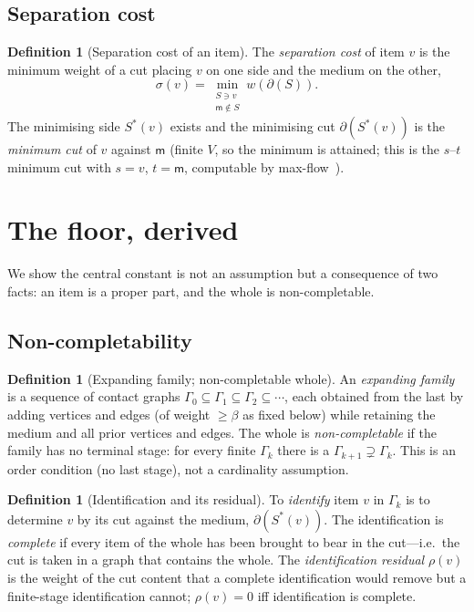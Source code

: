 \documentclass[11pt,a4paper]{article}
\theoremstyle{thmstyle}
\theoremstyle{definition}
\newtheorem{definition}[theorem]{Definition}
\theoremstyle{remark}
\newcommand{\Gph}{\Gamma}
\newcommand{\V}{V}
\newcommand{\wt}{w}
\newcommand{\med}{\mathsf{m}}            %
\newcommand{\flo}{\beta}                 %
\newcommand{\cut}{\partial}              %
\newcommand{\res}{\rho}                  %
\newcommand{\str}{\sigma}                %
\begin{document}
\subsection{Separation cost}

\begin{definition}[Separation cost of an item]
\label{def:sepcost}
The \emph{separation cost} of item $v$ is the minimum weight of a cut
placing $v$ on one side and the medium on the other,
\[
\str(v)=\min_{\substack{S\ni v\\ \med\notin S}}\wt(\cut(S)).
\]
The minimising side $S^{\ast}(v)$ exists and the minimising cut
$\cut(S^{\ast}(v))$ is the \emph{minimum cut} of $v$ against $\med$
(finite $\V$, so the minimum is attained; this is the $s$--$t$ minimum cut
with $s=v$, $t=\med$, computable by max-flow~\citep{fordfulkerson1956,%
mengertheorem}).
\end{definition}

\section{The floor, derived}
\label{sec:floor}

We show the central constant is not an assumption but a consequence of two
facts: an item is a proper part, and the whole is non-completable.

\subsection{Non-completability}

\begin{definition}[Expanding family; non-completable whole]
\label{def:noncompletable}
An \emph{expanding family} is a sequence of contact graphs
$\Gph_0\subseteq\Gph_1\subseteq\Gph_2\subseteq\cdots$, each obtained from
the last by adding vertices and edges (of weight $\ge\flo$ as fixed below)
while retaining the medium and all prior vertices and edges. The whole is
\emph{non-completable} if the family has no terminal stage: for every
finite $\Gph_k$ there is a $\Gph_{k+1}\supsetneq\Gph_k$. This is an order
condition (no last stage), not a cardinality assumption.
\end{definition}

\begin{definition}[Identification and its residual]
\label{def:identification}
To \emph{identify} item $v$ in $\Gph_k$ is to determine $v$ by its cut
against the medium, $\cut(S^{\ast}(v))$. The identification is
\emph{complete} if every item of the whole has been brought to bear in the
cut---i.e.\ the cut is taken in a graph that contains the whole. The
\emph{identification residual} $\res(v)$ is the weight of the cut content
that a complete identification would remove but a finite-stage
identification cannot; $\res(v)=0$ iff identification is complete.
\end{definition}
\end{document}
